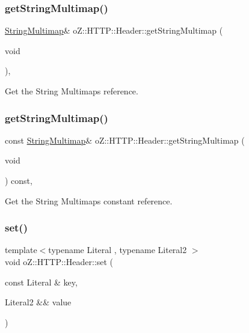 \subsubsection{\texorpdfstring{getStringMultimap()}{getStringMultimap()}\hspace{0.1cm}{\footnotesize\ttfamily [1/2]}}
{\footnotesize\ttfamily \mbox{\hyperlink{namespaceo_z_1_1_h_t_t_p_a339aac279d709cfa16148ad073500fc1}{String\+Multimap}}\& o\+Z\+::\+H\+T\+T\+P\+::\+Header\+::get\+String\+Multimap (\begin{DoxyParamCaption}\item[{void}]{ }\end{DoxyParamCaption})\hspace{0.3cm}{\ttfamily [inline]}, {\ttfamily [noexcept]}}



Get the String Multimap\textquotesingle{}s reference. 

\mbox{\label{classo_z_1_1_h_t_t_p_1_1_header_af1ee1c1e6a882a605407683341e32a8f}} 
\subsubsection{\texorpdfstring{getStringMultimap()}{getStringMultimap()}\hspace{0.1cm}{\footnotesize\ttfamily [2/2]}}
{\footnotesize\ttfamily const \mbox{\hyperlink{namespaceo_z_1_1_h_t_t_p_a339aac279d709cfa16148ad073500fc1}{String\+Multimap}}\& o\+Z\+::\+H\+T\+T\+P\+::\+Header\+::get\+String\+Multimap (\begin{DoxyParamCaption}\item[{void}]{ }\end{DoxyParamCaption}) const\hspace{0.3cm}{\ttfamily [inline]}, {\ttfamily [noexcept]}}



Get the String Multimap\textquotesingle{}s constant reference. 

\mbox{\label{classo_z_1_1_h_t_t_p_1_1_header_a3063660c3eb22844296e83807b8a62e1}} 
\subsubsection{\texorpdfstring{set()}{set()}}
{\footnotesize\ttfamily template$<$typename Literal , typename Literal2 $>$ \\
void o\+Z\+::\+H\+T\+T\+P\+::\+Header\+::set (\begin{DoxyParamCaption}\item[{const Literal \&}]{key,  }\item[{Literal2 \&\&}]{value }\end{DoxyParamCaption})\hspace{0.3cm}{\ttfamily [inline]}}



